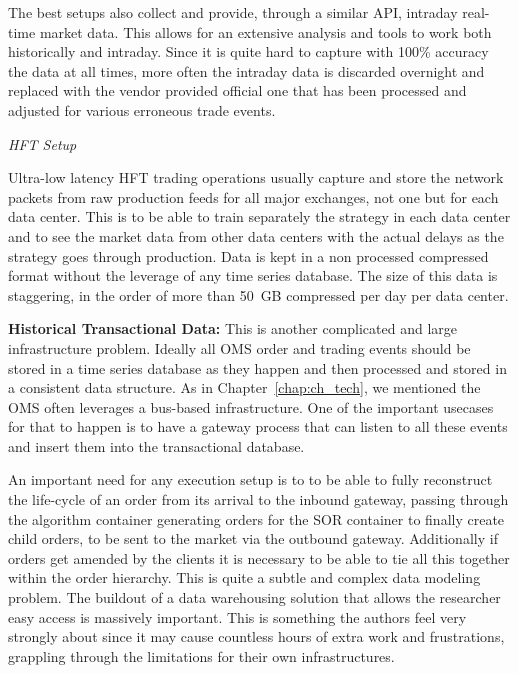 The best setups also collect and provide, through a similar API, intraday real-time market data. This allows for an extensive analysis and tools to work both historically and intraday. Since it is quite hard to capture with 100\% accuracy the data at all times, more often the intraday data is discarded overnight and replaced with the vendor provided official one that has been processed and adjusted for various erroneous trade events. \twomedskip


\noindent\emph{HFT Setup} \twomedskip


Ultra-low latency HFT trading operations usually capture and store the network packets from raw production feeds for all major exchanges, not one but for each data center. This is to be able to train separately the strategy in each data center and to see the market data from other data centers with the actual delays as the strategy goes through production. Data is kept in a non processed compressed format without the leverage of any time series database. The size of this data is staggering, in the order of more than 50~GB compressed per day per data center. \twomedskip


\noindent\textbf{Historical Transactional Data:} This is another complicated and large infrastructure problem. Ideally all OMS order and trading events should be stored in a time series database as they happen and then processed and stored in a consistent data structure. As in Chapter~\ref{chap:ch_tech}, we mentioned the OMS often leverages a bus-based infrastructure. One of the important usecases for that to happen is to have a gateway process that can listen to all these events and insert them into the transactional database.


An important need for any execution setup is to to be able to fully reconstruct the life-cycle of an order from its arrival to the inbound gateway, passing through the algorithm container generating orders for the SOR container to finally create child orders, to be sent to the market via the outbound gateway. Additionally if orders get amended by the clients it is necessary to be able to tie all this together within the order hierarchy. This is quite a subtle and complex data modeling problem. The buildout of a data warehousing solution that allows the researcher easy access is massively important. This is something the authors feel very strongly about since it may cause countless hours of extra work and frustrations, grappling through the limitations for their own infrastructures.


